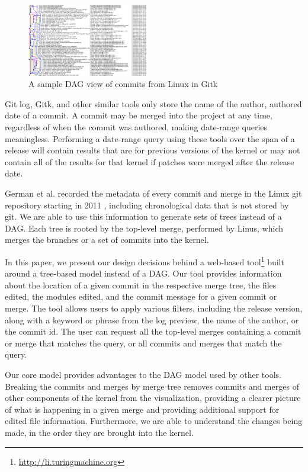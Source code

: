 \documentclass[conference, draftclsnofoot]{IEEEtran}
\begin{document}
\begin{figure}
	\centering
	\includegraphics[width=0.47\textwidth]{figures/gitk.png}
	\caption{A sample DAG view of commits from Linux in Gitk}
	\label{fig:gitk}
\end{figure}

Git log, Gitk, and other similar tools only store the name of the author, authored
date of a commit. A commit may be merged into the project at any time, regardless of
when the commit was authored, making date-range queries meaningless. Performing a
date-range query using these tools over the span of a release will contain results
that are for previous versions of the kernel or may not contain all of the results
for that kernel if patches were merged after the release date.

German et al. recorded the metadata of every commit and merge in the Linux git
repository starting in 2011 \cite{German}, including chronological data that is
not stored by git. We are able to use this information to generate sets of
trees instead of a DAG. Each tree is rooted by the top-level merge, performed
by Linus, which merges the branches or a set of commits into the kernel.

In this paper, we present our design decisions behind a web-based
tool\footnote{\url{http://li.turingmachine.org}} built around a tree-based
model instead of a DAG. Our tool provides information about the location of a
given commit in the respective merge tree, the files edited, the modules
edited, and the commit message for a given commit or merge. The tool allows
users to apply various filters, including the release version, along with a
keyword or phrase from the log preview, the name of the author, or the commit
id. The user can request all the top-level merges containing a commit or merge
that matches the query, or all commits and merges that match the query.

Our core model provides advantages to the DAG model used by other tools.
Breaking the commits and merges by merge tree removes commits and merges of
other components of the kernel from the visualization, providing a clearer
picture of what is happening in a given merge and providing additional
support for edited file information. Furthermore, we are able to understand the
changes being made, in the order they are brought into the kernel.
\end{document}
